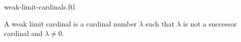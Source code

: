 \documentclass{naproche-library}
\begin{document}
\begin{smodule}[title=Weak Limit Cardinals]{weak-limit-cardinals.ftl}

\begin{definition}[forthel,id=SET_THEORY_06_8945210236547450]
  A weak limit cardinal is a cardinal number $\lambda$ such that $\lambda$ is not a successor cardinal and $\lambda \neq 0$.
\end{definition}
\end{smodule}
\end{document}
